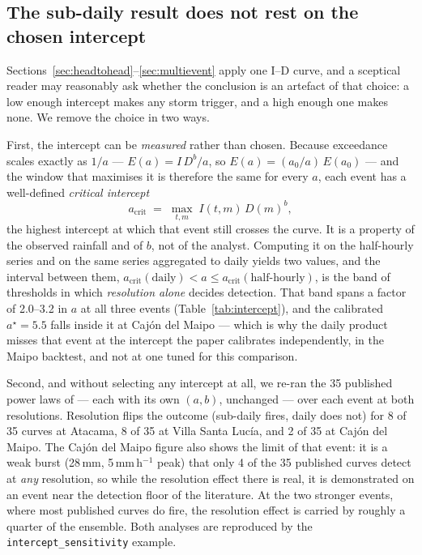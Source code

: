 \documentclass[authoryear,preprint,review,12pt]{elsarticle}
\begin{document}
\subsection{The sub-daily result does not rest on the chosen intercept}
\label{sec:intercept}

Sections~\ref{sec:headtohead}--\ref{sec:multievent} apply one I--D curve, and a
sceptical reader may reasonably ask whether the conclusion is an artefact of that
choice: a low enough intercept makes any storm trigger, and a high enough one makes
none. We remove the choice in two ways.

First, the intercept can be \emph{measured} rather than chosen. Because exceedance
scales exactly as $1/a$ --- $E(a)=I\,D^{b}/a$, so $E(a)=(a_0/a)\,E(a_0)$ --- and the
window that maximises it is therefore the same for every $a$, each event has a
well-defined \emph{critical intercept}
\begin{equation}
a_\mathrm{crit} \;=\; \max_{t,m}\; I(t,m)\,D(m)^{b},
\label{eq:acrit}
\end{equation}
the highest intercept at which that event still crosses the curve. It is a property
of the observed rainfall and of $b$, not of the analyst. Computing it on the
half-hourly series and on the same series aggregated to daily yields two values,
and the interval between them,
$a_\mathrm{crit}(\text{daily}) < a \leq a_\mathrm{crit}(\text{half-hourly})$, is the
band of thresholds in which \emph{resolution alone} decides detection. That band
spans a factor of 2.0--3.2 in $a$ at all three events (Table~\ref{tab:intercept}),
and the calibrated $a^\star=5.5$ falls inside it at Caj\'on del Maipo --- which is
why the daily product misses that event at the intercept the paper calibrates
independently, in the Maipo backtest, and not at one tuned for this comparison.

Second, and without selecting any intercept at all, we re-ran the 35 published
power laws of \citet{guzzetti2007} --- each with its own $(a,b)$, unchanged ---
over each event at both resolutions. Resolution flips the outcome (sub-daily fires,
daily does not) for 8 of 35 curves at Atacama, 8 of 35 at Villa Santa Luc\'ia, and 2
of 35 at Caj\'on del Maipo. The Caj\'on del Maipo figure also shows the limit of that event: it is a weak burst (28\,mm, 5\,mm\,h$^{-1}$ peak) that only 4
of the 35 published curves detect at \emph{any} resolution, so while the
resolution effect there is real, it is demonstrated on an event near the detection
floor of the literature. At the two stronger events, where most published curves do
fire, the resolution effect is carried by roughly a quarter of the ensemble. Both
analyses are reproduced by the \texttt{intercept\_sensitivity} example.
\end{document}
